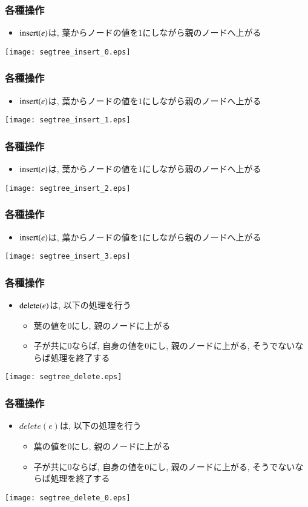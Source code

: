 \documentclass[dvipdfmx,12pt,notheorems]{beamer}
\theoremstyle{definition}
\newcommand{\func}[1]{\ensuremath\mathrm{#1}}
\begin{document}
\begin{frame}\frametitle{各種操作}
\begin{itemize}
\item $\func{insert}(e)$は, 葉からノードの値を$1$にしながら親のノードへ上がる
\end{itemize}
\texttt{[image: segtree\_insert\_0.eps]}
\end{frame}

\begin{frame}\frametitle{各種操作}
\begin{itemize}
\item $\func{insert}(e)$は, 葉からノードの値を$1$にしながら親のノードへ上がる
\end{itemize}
\texttt{[image: segtree\_insert\_1.eps]}
\end{frame}

\begin{frame}\frametitle{各種操作}
\begin{itemize}
\item $\func{insert}(e)$は, 葉からノードの値を$1$にしながら親のノードへ上がる
\end{itemize}
\texttt{[image: segtree\_insert\_2.eps]}
\end{frame}

\begin{frame}\frametitle{各種操作}
\begin{itemize}
\item $\func{insert}(e)$は, 葉からノードの値を$1$にしながら親のノードへ上がる
\end{itemize}
\texttt{[image: segtree\_insert\_3.eps]}
\end{frame}

\begin{frame}\frametitle{各種操作}
\begin{itemize}
\item $\func{delete}(e)$は, 以下の処理を行う
\begin{itemize}
\item 葉の値を$0$にし, 親のノードに上がる
\item 子が共に$0$ならば, 自身の値を$0$にし, 親のノードに上がる, そうでないならば処理を終了する
\end{itemize}
\end{itemize}
\texttt{[image: segtree\_delete.eps]}
\end{frame}

\begin{frame}\frametitle{各種操作}
\begin{itemize}
\item $delete(e)$は, 以下の処理を行う
\begin{itemize}
\item 葉の値を$0$にし, 親のノードに上がる
\item 子が共に$0$ならば, 自身の値を$0$にし, 親のノードに上がる, そうでないならば処理を終了する
\end{itemize}
\end{itemize}
\texttt{[image: segtree\_delete\_0.eps]}
\end{frame}
\end{document}
